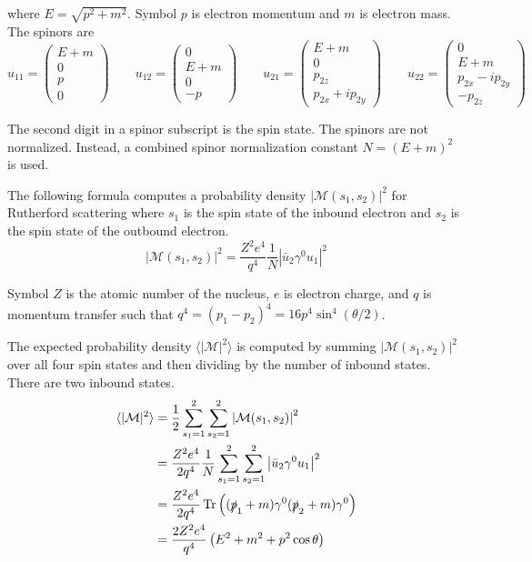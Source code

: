 \documentclass[12pt]{article}
\begin{document}
\noindent
where $E=\sqrt{p^2+m^2}$.
Symbol $p$ is electron momentum and $m$ is electron mass.
The spinors are
\begin{equation*}
u_{11}=\begin{pmatrix}E+m\\0\\p\\0\end{pmatrix}
\qquad
u_{12}=\begin{pmatrix}0\\E+m\\0\\-p\end{pmatrix}
\qquad
u_{21}=\begin{pmatrix}E+m\\0\\p_{2z}\\p_{2x}+ip_{2y}\end{pmatrix}
\qquad
u_{22}=\begin{pmatrix}0\\E+m\\p_{2x}-ip_{2y}\\-p_{2z}\end{pmatrix}
\end{equation*}

\noindent
The second digit in a spinor subscript is the spin state.
The spinors are not normalized.
Instead, a combined spinor normalization constant $N=(E+m)^2$ is used.

\bigskip
\noindent
The following formula computes a probability density $|\mathcal{M}(s_1,s_2)|^2$ for Rutherford scattering
where $s_1$ is the spin state of the inbound electron and $s_2$ is the spin state of the outbound electron.
\begin{equation*}
|\mathcal{M}(s_1,s_2)|^2=\frac{Z^2e^4}{q^4}\frac{1}{N}\left|\bar{u}_2\gamma^0 u_1\right|^2
\end{equation*}

\noindent
Symbol $Z$ is the atomic number of the nucleus,
$e$ is electron charge,
and $q$ is momentum transfer such that $q^4=(p_1-p_2)^4=16p^4\sin^4(\theta/2)$.

\bigskip
\noindent
The expected probability density
$\langle\vert\mathcal{M}\vert^2\rangle$
is computed by summing $|\mathcal{M}(s_1,s_2)|^2$
over all four spin states and then dividing by the number of inbound states.
There are two inbound states.
\begin{align*}
\langle\vert\mathcal{M}\vert^2\rangle
&=\frac{1}{2}\sum_{s_1=1}^2\sum_{s_2=1}^2\left|\mathcal{M}(s_1,s_2)\right|^2
\\
&=\frac{Z^2e^4}{2q^4}\frac{1}{N}\sum_{s_1=1}^2\sum_{s_2=1}^2\left|\bar{u}_2\gamma^0 u_1\right|^2
\\
&=\frac{Z^2e^4}{2q^4}\mathop{\rm Tr}\left((\slashed{p}_1+m)\gamma^0(\slashed{p}_2+m)\gamma^0\right)
\\
&=\frac{2Z^2e^4}{q^4}\left(E^2+m^2+p^2\cos\theta\right)
\end{align*}
\end{document}
